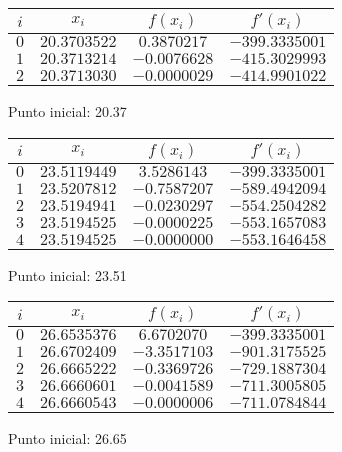 \begin{figure}[H]
	\centering
	\caption{Punto inicial: 20.37}
	\begin{tabular}{|c|c|c|c|} \hline
		$i$ & $x_{i}$ & $f(x_{i})$ & $f'(x_{i})$ \\ \hline
		$0$ & $20.3703522$ & $0.3870217$ & $-399.3335001$ \\ \hline
		$1$ & $20.3713214$ & $-0.0076628$ & $-415.3029993$ \\ \hline
		$2$ & $20.3713030$ & $-0.0000029$ & $-414.9901022$ \\ \hline
	\end{tabular}
\end{figure}
\begin{figure}[H]
	\centering
	\caption{Punto inicial: 23.51}
	\begin{tabular}{|c|c|c|c|} \hline
		$i$ & $x_{i}$ & $f(x_{i})$ & $f'(x_{i})$ \\ \hline
		$0$ & $23.5119449$ & $3.5286143$ & $-399.3335001$ \\ \hline
		$1$ & $23.5207812$ & $-0.7587207$ & $-589.4942094$ \\ \hline
		$2$ & $23.5194941$ & $-0.0230297$ & $-554.2504282$ \\ \hline
		$3$ & $23.5194525$ & $-0.0000225$ & $-553.1657083$ \\ \hline
		$4$ & $23.5194525$ & $-0.0000000$ & $-553.1646458$ \\ \hline
	\end{tabular}
\end{figure}
\begin{figure}[H]
	\centering
	\caption{Punto inicial: 26.65}
	\begin{tabular}{|c|c|c|c|} \hline
		$i$ & $x_{i}$ & $f(x_{i})$ & $f'(x_{i})$ \\ \hline
		$0$ & $26.6535376$ & $6.6702070$ & $-399.3335001$ \\ \hline
		$1$ & $26.6702409$ & $-3.3517103$ & $-901.3175525$ \\ \hline
		$2$ & $26.6665222$ & $-0.3369726$ & $-729.1887304$ \\ \hline
		$3$ & $26.6660601$ & $-0.0041589$ & $-711.3005805$ \\ \hline
		$4$ & $26.6660543$ & $-0.0000006$ & $-711.0784844$ \\ \hline
	\end{tabular}
\end{figure}
